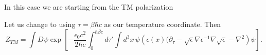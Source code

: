 In this case we are starting from the TM polarization

Let us change to using $\tau = \beta \hbar c$ as our temperature coordinate.  Then   
\begin{equation}
Z_{TM} = \int D\psi \exp\left[ -\frac{\epsilon_0 c^2 }{2 \hbar c}\int_0^{\hbar\beta c} 
d\tau'\int d^3x\, \psi\left( \epsilon(x)(\partial_{\tau}
  -\sqrt{\epsilon}\nabla \epsilon^{-1}\nabla\sqrt{\epsilon} -\nabla^2\right)\psi\right].
\end{equation}

